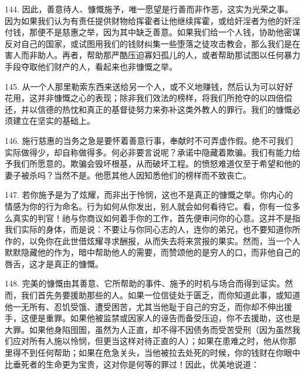 144. 因此，善意待人、慷慨施予，唯一愿望是行善而非作恶，这实为光荣之事。因为如果我们认为有责任提供财物给挥霍者让他继续挥霍，或给奸淫者为他的奸淫付钱，那便不是慈惠之举，因为其中缺乏善意。如果我们给一个人钱，协助他密谋反对自己的国家，或试图用我们的钱财纠集一些堕落之徒攻击教会，那么我们是在害人而非助人。再者，帮助那严酷压迫寡妇孤儿的人，或者帮助那试图以任何暴力手段夺取他们财产的人，看起来也非慷慨之举。\par

145. 从一个人那里勒索东西来送给另一个人，或不义地赚钱，然后认为可以好好花用，这并非慷慨之心的表现；除非我们效法的榜样，将我们所抢夺的以四倍偿还，并以信德的热忱和真正的基督徒努力来弥补这类外教人的罪行。我们的慷慨必须建立在坚实的基础上。\par

146. 施行慈惠的当务之急是要怀着善意行事，奉献时不可弄虚作假。绝不可我们实际做得少，却自称做得多。何必非要言说呢？承诺中隐藏着欺骗。我们有能力给予我们所愿意的。欺骗会毁坏根基，从而破坏工程。的愤怒难道仅至于希望和他的妻子被杀吗？当然不是。他愿其他人因知悉他们的榜样而不致丧亡。\par

147. 若你施予是为了炫耀，而非出于怜悯，这也不是真正的慷慨之举。你内心的情感为你的行为命名。行为如何从你发出，别人就会如何看待它。看，你有一位多么真实的判官！祂与你商议如何着手你的工作，首先便审问你的心意。这并不是指我们实际的身体，而是说：不要让与你同心志的人，连你的弟兄，也不要知道你所作的，以免你在此世借炫耀寻求酬报，从而失去将来赏报的果实。然而，当一个人默默隐藏他的作为，暗中帮助他人的需要，而赞颂他的是穷人的口，而非他自己的唇舌，这才是真正的慷慨。\par

148. 完美的慷慨由其善意、它所帮助的事件、施予的时机与场合而得到证实。然而，我们首先务要援助那些的人。如果一位信徒处于匮乏，而你知道此事，或知道他一无所有、忍饥受饿、遭受困苦，尤其当他耻于自己的穷乏，而你却不伸出援手，这便是重罪。如果他被监禁或因家人的诬告而备受压迫，你不去援助，这也是大罪。如果他身陷囹圄，虽然为人正直，却不得不因债务而受苦受刑（因为虽然我们应对所有人施以怜悯，但更当这样对待正直的人）；如果在患难之时，他从你那里得不到任何帮助；如果在危急关头，当他被拉去处死的时候，你的钱财在你眼中比垂死者的生命更为宝贵，这对你是何等的罪过！因此，优美地说道：\par

